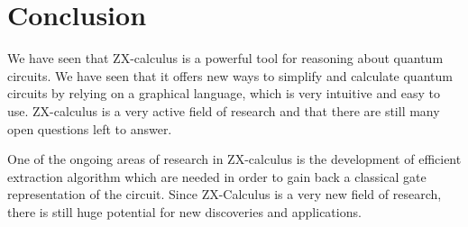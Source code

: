 \section{Conclusion}

We have seen that ZX-calculus is a powerful tool for reasoning about quantum circuits. We have seen that it offers new ways to simplify and calculate quantum circuits by relying on a graphical language, which is very intuitive and easy to use. ZX-calculus is a very active field of research and that there are still many open questions left to answer.

One of the ongoing areas of research in ZX-calculus is the development of efficient extraction algorithm which are needed in order to gain back a classical gate representation of the circuit. Since ZX-Calculus is a very new field of research, there is still huge potential for new discoveries and applications.